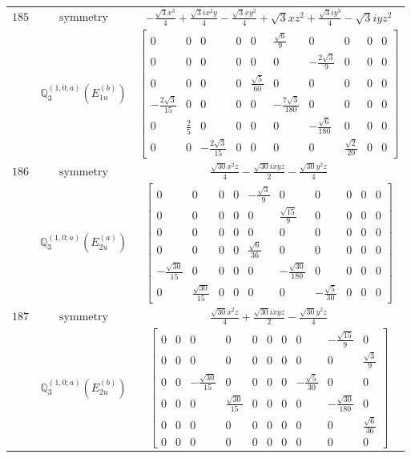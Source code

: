 \documentclass[fleqn,8pt,landscape]{jsarticle}
\begin{document}
\begin{longtable}{ccc}
$ 185 $ & $ \text{symmetry} $ & $ - \frac{\sqrt{3} x^{3}}{4} + \frac{\sqrt{3} i x^{2} y}{4} - \frac{\sqrt{3} x y^{2}}{4} + \sqrt{3} x z^{2} + \frac{\sqrt{3} i y^{3}}{4} - \sqrt{3} i y z^{2} $ \\
$  $ & $ \mathbb{Q}_{3}^{(1,0;a)}(E_{1u}^{(b)}) $ & $ \begin{bmatrix} 0 & 0 & 0 & 0 & 0 & \frac{\sqrt{6}}{9} & 0 & 0 & 0 & 0 \\ 0 & 0 & 0 & 0 & 0 & 0 & - \frac{2 \sqrt{3}}{9} & 0 & 0 & 0 \\ 0 & 0 & 0 & 0 & \frac{\sqrt{5}}{60} & 0 & 0 & 0 & 0 & 0 \\ - \frac{2 \sqrt{3}}{15} & 0 & 0 & 0 & 0 & - \frac{7 \sqrt{3}}{180} & 0 & 0 & 0 & 0 \\ 0 & \frac{2}{5} & 0 & 0 & 0 & 0 & - \frac{\sqrt{6}}{180} & 0 & 0 & 0 \\ 0 & 0 & - \frac{2 \sqrt{3}}{15} & 0 & 0 & 0 & 0 & \frac{\sqrt{2}}{20} & 0 & 0 \end{bmatrix} $ \\ \hline
$ 186 $ & $ \text{symmetry} $ & $ \frac{\sqrt{30} x^{2} z}{4} - \frac{\sqrt{30} i x y z}{2} - \frac{\sqrt{30} y^{2} z}{4} $ \\
$  $ & $ \mathbb{Q}_{3}^{(1,0;a)}(E_{2u}^{(a)}) $ & $ \begin{bmatrix} 0 & 0 & 0 & 0 & - \frac{\sqrt{3}}{9} & 0 & 0 & 0 & 0 & 0 \\ 0 & 0 & 0 & 0 & 0 & \frac{\sqrt{15}}{9} & 0 & 0 & 0 & 0 \\ 0 & 0 & 0 & 0 & 0 & 0 & 0 & 0 & 0 & 0 \\ 0 & 0 & 0 & 0 & \frac{\sqrt{6}}{36} & 0 & 0 & 0 & 0 & 0 \\ - \frac{\sqrt{30}}{15} & 0 & 0 & 0 & 0 & - \frac{\sqrt{30}}{180} & 0 & 0 & 0 & 0 \\ 0 & \frac{\sqrt{30}}{15} & 0 & 0 & 0 & 0 & - \frac{\sqrt{5}}{30} & 0 & 0 & 0 \end{bmatrix} $ \\ \hline
$ 187 $ & $ \text{symmetry} $ & $ \frac{\sqrt{30} x^{2} z}{4} + \frac{\sqrt{30} i x y z}{2} - \frac{\sqrt{30} y^{2} z}{4} $ \\
$  $ & $ \mathbb{Q}_{3}^{(1,0;a)}(E_{2u}^{(b)}) $ & $ \begin{bmatrix} 0 & 0 & 0 & 0 & 0 & 0 & 0 & 0 & - \frac{\sqrt{15}}{9} & 0 \\ 0 & 0 & 0 & 0 & 0 & 0 & 0 & 0 & 0 & \frac{\sqrt{3}}{9} \\ 0 & 0 & - \frac{\sqrt{30}}{15} & 0 & 0 & 0 & 0 & - \frac{\sqrt{5}}{30} & 0 & 0 \\ 0 & 0 & 0 & \frac{\sqrt{30}}{15} & 0 & 0 & 0 & 0 & - \frac{\sqrt{30}}{180} & 0 \\ 0 & 0 & 0 & 0 & 0 & 0 & 0 & 0 & 0 & \frac{\sqrt{6}}{36} \\ 0 & 0 & 0 & 0 & 0 & 0 & 0 & 0 & 0 & 0 \end{bmatrix} $ \\ \hline

\end{longtable}
\end{document}
